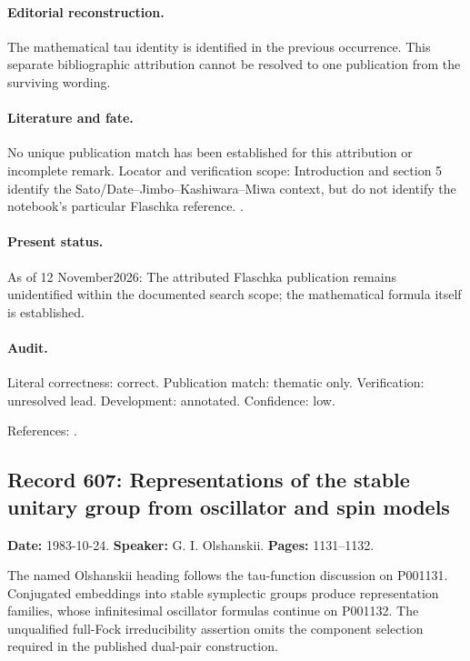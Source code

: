\paragraph{Editorial reconstruction.} The mathematical tau identity is identified in the previous occurrence. This separate bibliographic attribution cannot be resolved to one publication from the surviving wording.

\paragraph{Literature and fate.} No unique publication match has been established for this attribution or incomplete remark. Locator and verification scope: Introduction and section 5 identify the Sato/Date--Jimbo--Kashiwara--Miwa context, but do not identify the notebook's particular Flaschka reference. \cite{segalwilson1985loop}.

\paragraph{Present status.} As of 12 November2026: The attributed Flaschka publication remains unidentified within the documented search scope; the mathematical formula itself is established.

\paragraph{Audit.} Literal correctness: correct. Publication match: thematic only. Verification: unresolved lead. Development: annotated. Confidence: low.

\noindent References: \citep{segalwilson1985loop}.\par

\subsection{Record 607: Representations of the stable unitary group from oscillator and spin models}

\label{talk:607}

\noindent\textbf{Date:} 1983-10-24. \textbf{Speaker:} G. I. Olshanskii. \textbf{Pages:} 1131--1132.\par

The named Olshanskii heading follows the tau-function discussion on P001131. Conjugated embeddings into stable symplectic groups produce representation families, whose infinitesimal oscillator formulas continue on P001132. The unqualified full-Fock irreducibility assertion omits the component selection required in the published dual-pair construction.

